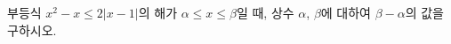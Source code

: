 부등식 $x^2-x\le 2|x-1|$의 해가 $\alpha\le x\le \beta$일 때, 상수 $\alpha$, $\beta$에 대하여 $\beta-\alpha$의 값을 구하시오.
